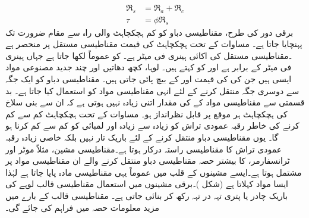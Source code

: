 \begin{align}
\Re_s&=\Re_a+\Re_c\\
\tau&=\phi \Re_s \label{مساوات_مقناطیسی_دور_مقناطیسی_اوہم_قانون}
\end{align}
برقی دور کی طرح، مقناطیسی دباو کو کم ہچکچاہٹ والی راہ سے مقام ضرورت تک پہنچایا جاتا ہے۔ مساوات    کے تحت  ہچکچاہٹ کی قیمت  مقناطیسی مستقل  پر منحصر ہے ۔مقناطیسی مستقل کی اکائی  ہینری فی میٹر  ہے۔ کو عموماً  لکھا جاتا ہے جہاں   ہینری فی میٹر کے برابر ہے اور  کو  کہتے ہیں۔ لوہا،  کچھ دھاتیں اور چند جدید مصنوعی مواد  ایسی ہیں جن کی  کی قیمت  اور  کے  بیچ پائی جاتی ہیں۔ مقناطیسی دباو کو  ایک جگہ سے دوسری جگہ منتقل کرنے کے لئے انہی مقناطیسی مواد کو  استعمال کیا جاتا ہے۔ بد قسمتی سے  مقناطیسی مواد کے   کی مقدار اتنی زیادہ  نہیں ہوتی ہے کہ ان سے بنی سلاخ کی ہچکچاہٹ ہر موقع پر قابل نظرانداز ہو۔ مساوات   کے تحت  ہچکچاہٹ کم سے کم کرنے کی خاطر رقبہ عمودی تراش کو زیادہ سے زیادہ اور لمبائی کو کم سے کم  کرنا ہو گا۔ یوں مقناطیسی دباو منتقل کرنے کے لئے  باریک تار نہیں بلکہ خاصی زیادہ رقبہ عمودی تراش کا مقناطیسی راستہ  درکار ہوتا ہے۔مقناطیسی مشین، مثلاً موٹر اور ٹرانسفارمر، کا بیشتر حصہ مقناطیسی دباو منتقل کرنے والے ان مقناطیسی مواد  پر مشتمل ہوتا ہے۔ایسے مشینوں کے قلب میں عموماً یہی مقناطیسی مادہ پایا جاتا ہے لہٰذا ایسا مواد   کہلاتا ہے (شکل )۔برقی مشینوں میں استعمال  مقناطیسی قالب لوہے کی باریک چادر یا پتری  تہہ  در تہہ رکھ کر بنائی جاتی ہے۔ مقناطیسی قالب کے بارے میں مزید معلومات حصہ   میں  فراہم کی جائے گی۔

